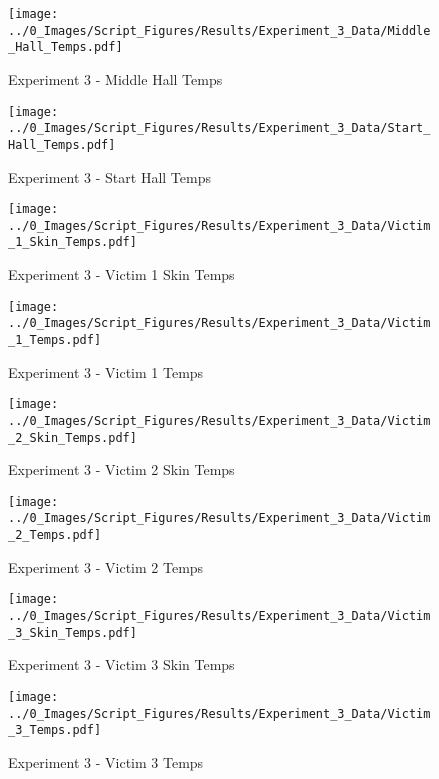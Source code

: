 	\clearpage

	\begin{figure}[H]
		\centering
		\texttt{[image: ../0\_Images/Script\_Figures/Results/Experiment\_3\_Data/Middle\_Hall\_Temps.pdf]}
		\caption[]{Experiment 3 - Middle Hall Temps}
	\end{figure}
 

	\begin{figure}[H]
		\centering
		\texttt{[image: ../0\_Images/Script\_Figures/Results/Experiment\_3\_Data/Start\_Hall\_Temps.pdf]}
		\caption[]{Experiment 3 - Start Hall Temps}
	\end{figure}
 
	\clearpage

	\begin{figure}[H]
		\centering
		\texttt{[image: ../0\_Images/Script\_Figures/Results/Experiment\_3\_Data/Victim\_1\_Skin\_Temps.pdf]}
		\caption[]{Experiment 3 - Victim 1 Skin Temps}
	\end{figure}
 

	\begin{figure}[H]
		\centering
		\texttt{[image: ../0\_Images/Script\_Figures/Results/Experiment\_3\_Data/Victim\_1\_Temps.pdf]}
		\caption[]{Experiment 3 - Victim 1 Temps}
	\end{figure}
 
	\clearpage

	\begin{figure}[H]
		\centering
		\texttt{[image: ../0\_Images/Script\_Figures/Results/Experiment\_3\_Data/Victim\_2\_Skin\_Temps.pdf]}
		\caption[]{Experiment 3 - Victim 2 Skin Temps}
	\end{figure}
 

	\begin{figure}[H]
		\centering
		\texttt{[image: ../0\_Images/Script\_Figures/Results/Experiment\_3\_Data/Victim\_2\_Temps.pdf]}
		\caption[]{Experiment 3 - Victim 2 Temps}
	\end{figure}
 
	\clearpage

	\begin{figure}[H]
		\centering
		\texttt{[image: ../0\_Images/Script\_Figures/Results/Experiment\_3\_Data/Victim\_3\_Skin\_Temps.pdf]}
		\caption[]{Experiment 3 - Victim 3 Skin Temps}
	\end{figure}
 

	\begin{figure}[H]
		\centering
		\texttt{[image: ../0\_Images/Script\_Figures/Results/Experiment\_3\_Data/Victim\_3\_Temps.pdf]}
		\caption[]{Experiment 3 - Victim 3 Temps}
	\end{figure}
 

